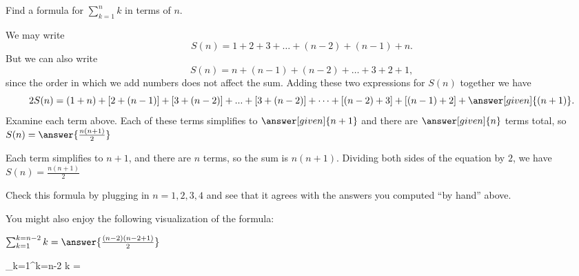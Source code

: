 \documentclass{ximera}
\begin{document}
\begin{question}
	Find a formula for $\sum_{k=1}^{n} k$ in terms of $n$.

          We may write
          \[
          S(n) = 1+2+3+\dots+(n-2)+(n-1)+n.
          \]
	  But we can also write
          \[
          S(n) = n+(n-1)+(n-2)+\dots+3+2+1,
          \]
          since the order in which we add numbers does not affect the sum. Adding these two expressions for $S(n)$ together we have
          \[
          2S(n) = (1+n)+[2+(n-1)]+[3+(n-2)]+...+[3+(n-2)]+\dots+[(n-2)+3]+[(n-1)+2]+\answer[given]{(n+1)}.
          \]
          Examine each term above. Each of these terms simplifies to
          $\answer[given]{n+1}$ and there are $\answer[given]{n}$
          terms total, so $S(n) = \answer{\frac{n(n+1)}{2}}$
	 \begin{hint}
	 	 Each term simplifies to $n+1$, and there are $n$ terms, so the sum is $n(n+1)$.  Dividing both sides of the equation by $2$, we have $S(n) = \frac{n(n+1)}{2}$
	 \end{hint}
	 
	 Check this formula by plugging in $n=1,2,3,4$ and see that it agrees with the answers you computed ``by hand'' above.
	 
	 \begin{multipleChoice}
	 \end{multipleChoice}
	 
	 You might also enjoy the following visualization of the formula:
	 
\end{question}




\begin{question}
	$\sum_{k=1}^{k=n-2} k = \answer{ \frac{(n-2)(n-2+1)}{2} }$
	\begin{hint}
		\sum_{k=1}^{k=n-2} k =  
	\end{hint}
\end{question}
\end{document}
